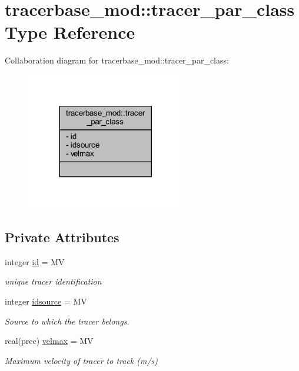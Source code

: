 \hypertarget{structtracerbase__mod_1_1tracer__par__class}{}\section{tracerbase\+\_\+mod\+:\+:tracer\+\_\+par\+\_\+class Type Reference}
\label{structtracerbase__mod_1_1tracer__par__class}


Collaboration diagram for tracerbase\+\_\+mod\+:\+:tracer\+\_\+par\+\_\+class\+:\nopagebreak
\begin{figure}[H]
\begin{center}
\leavevmode
\includegraphics[width=197pt]{structtracerbase__mod_1_1tracer__par__class__coll__graph}
\end{center}
\end{figure}
\subsection*{Private Attributes}
\begin{DoxyCompactItemize}
\item 
integer \mbox{\hyperlink{structtracerbase__mod_1_1tracer__par__class_adcbab7942d36e2c6d3cb41fc44c64347}{id}} = MV
\begin{DoxyCompactList}\small\item\em unique tracer identification \end{DoxyCompactList}\item 
integer \mbox{\hyperlink{structtracerbase__mod_1_1tracer__par__class_a3f68dcc16fb53779c2fd28cfa2b8393d}{idsource}} = MV
\begin{DoxyCompactList}\small\item\em Source to which the tracer belongs. \end{DoxyCompactList}\item 
real(prec) \mbox{\hyperlink{structtracerbase__mod_1_1tracer__par__class_aed66c62e3a6b58b622db19c61665efbf}{velmax}} = MV
\begin{DoxyCompactList}\small\item\em Maximum velocity of tracer to track (m/s) \end{DoxyCompactList}\end{DoxyCompactItemize}


